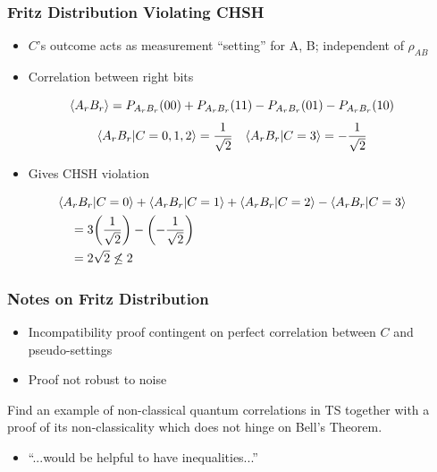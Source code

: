 \documentclass[
    hyperref={bookmarks=false},%
    xcolor={dvipsnames},
]{beamer}
\begin{document}
\begin{frame}
    \frametitle{Fritz Distribution Violating CHSH}
    \begin{itemize}
        \item $C$'s outcome acts as measurement ``setting'' for A, B; independent of $\rho_{AB}$
        \item Correlation between right bits
    \end{itemize}
    \[ \ba{A_rB_r} = \prob[A_rB_r][00] + \prob[A_rB_r][11] - \prob[A_rB_r][01] - \prob[A_rB_r][10] \]
    \[ \ba{A_rB_r | C = 0, 1, 2} = \f{1}{\sqrt{2}} \quad \ba{A_rB_r | C = 3} = - \f{1}{\sqrt{2}} \]
    \begin{itemize}
        \item Gives CHSH violation
    \end{itemize}
    \begin{align*}
    &\ba{A_rB_r|C=0} + \ba{A_rB_r|C=1} + \ba{A_rB_r|C=2} - \ba{A_rB_r|C=3} \\
    &\quad = 3 \br{\f{1}{\sqrt{2}}} - \br{-\f{1}{\sqrt{2}}} \\
    &\quad = 2\sqrt{2} \not \leq 2
    \end{align*}
\end{frame}

\begin{frame}
    \frametitle{Notes on Fritz Distribution}
    \begin{itemize}
        \item Incompatibility proof contingent on perfect correlation between $C$ and pseudo-settings
        \item Proof not robust to noise
    \end{itemize}
    \begin{problem}
        Find an example of non-classical quantum correlations in TS together with a proof of its non-classicality which does not hinge on Bell’s Theorem.
    \end{problem}
    \begin{itemize}
        \item ``...would be helpful to have inequalities...''
    \end{itemize}
\end{frame}
\end{document}
